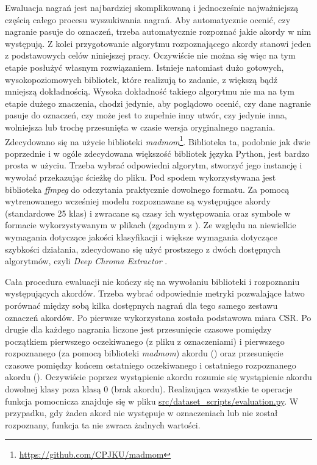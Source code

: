 Ewaluacja nagrań jest najbardziej skomplikowaną i jednocześnie najważniejszą częścią całego procesu wyszukiwania nagrań. Aby automatycznie ocenić, czy nagranie pasuje do oznaczeń, trzeba automatycznie rozpoznać jakie akordy w nim występują. Z kolei przygotowanie algorytmu rozpoznającego akordy stanowi jeden z podstawowych celów niniejszej pracy. Oczywiście nie można się więc na tym etapie posłużyć własnym rozwiązaniem. Istnieje natomiast dużo gotowych, wysokopoziomowych bibliotek, które realizują to zadanie, z większą bądź mniejszą dokładnością. Wysoka dokładność takiego algorytmu nie ma na tym etapie dużego znaczenia, chodzi jedynie, aby poglądowo ocenić, czy dane nagranie pasuje do oznaczeń, czy może jest to zupełnie inny utwór, czy jedynie inna, wolniejsza lub trochę przesunięta w czasie wersja oryginalnego nagrania. Zdecydowano się na użycie biblioteki \emph{madmom}\footnote{\url{https://github.com/CPJKU/madmom}}.  Biblioteka ta, podobnie jak dwie poprzednie i w ogóle zdecydowana większość bibliotek języka Python, jest bardzo prosta w użyciu. Trzeba wybrać odpowiedni algorytm, stworzyć jego instancję i wywołać przekazując ścieżkę do pliku. Pod spodem wykorzystywana jest biblioteka \emph{ffmpeg} do odczytania praktycznie dowolnego formatu. Za pomocą wytrenowanego wcześniej modelu rozpoznawane są występujące akordy (standardowe 25 klas) i zwracane są czasy ich występowania oraz symbole w formacie wykorzystywanym w plikach  (zgodnym z \cite{harte_towards_nodate}). Ze względu na niewielkie wymagania dotyczące jakości klasyfikacji i większe wymagania dotyczące szybkości działania, zdecydowano się użyć prostszego z dwóch dostępnych algorytmów, czyli \emph{Deep Chroma Extractor} \cite{korzeniowski_feature_2016}.

Cała procedura ewaluacji nie kończy się na wywołaniu biblioteki i rozpoznaniu występujących akordów.  Trzeba wybrać odpowiednie metryki pozwalające łatwo porównać między sobą kilka dostępnych nagrań dla tego samego zestawu oznaczeń akordów. Po pierwsze wykorzystana została podstawowa miara CSR. Po drugie dla każdego nagrania liczone jest przesunięcie czasowe pomiędzy początkiem pierwszego oczekiwanego (z pliku z oznaczeniami) i pierwszego rozpoznanego (za pomocą biblioteki \emph{madmom}) akordu () oraz przesunięcie czasowe pomiędzy końcem ostatniego oczekiwanego i ostatniego rozpoznanego akordu (). Oczywiście poprzez wystąpienie akordu rozumie się wystąpienie akordu dowolnej klasy poza klasą 0 (brak akordu). Realizująca wszystkie te operacje funkcja pomocnicza znajduje się w pliku \url{src/dataset_scripts/evaluation.py}. W przypadku, gdy żaden akord nie występuje w oznaczeniach lub nie został rozpoznany, funkcja ta nie zwraca żadnych wartości.

